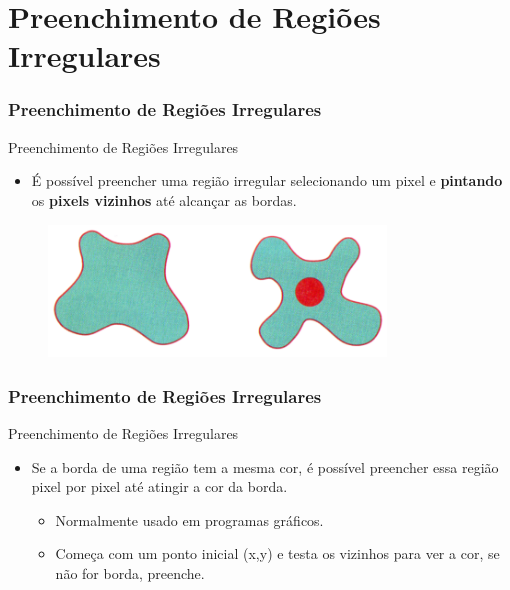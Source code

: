 \documentclass{beamer}
\begin{document}
\section{Preenchimento de Regiões Irregulares}
\begin{frame}
\frametitle{Preenchimento de Regiões Irregulares}
	
	\begin{block}{Preenchimento de Regiões Irregulares}

		\begin{itemize}
			\item É possível preencher uma região irregular selecionando um pixel e \textbf{pintando} os \textbf{pixels vizinhos} até alcançar as bordas.
		\end{itemize}
	\end{block}

	\begin{figure}[!h]
			\begin{center}
				\includegraphics[width=0.8\textwidth]{Figures/RegIrr}
			\end{center}
	\end{figure}
	
\end{frame}


\begin{frame}
\frametitle{Preenchimento de Regiões Irregulares}

	\begin{block}{Preenchimento de Regiões Irregulares}
		\begin{itemize}
			\item Se a borda de uma região tem a mesma cor, é possível preencher essa região pixel por pixel até atingir a cor da borda.
				\begin{itemize}
					\item Normalmente usado em programas gráficos.
					\item Começa com um ponto inicial (x,y) e testa os vizinhos para ver a cor, se não for borda, preenche.
				\end{itemize}
		\end{itemize}
	\end{block}
\end{frame}
\end{document}
